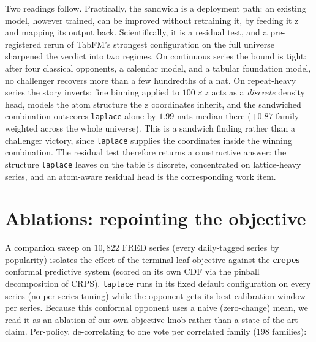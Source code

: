 \documentclass[article]{jss}
\providecommand{\proglang}[1]{\textsf{#1}}
\providecommand{\pkg}[1]{\textbf{#1}}
\providecommand{\code}[1]{\texttt{#1}}
\begin{document}
Two readings follow. Practically, the sandwich is a deployment path: an
existing model, however trained, can be improved without retraining it,
by feeding it z and mapping its output back. Scientifically, it is a
residual test, and a pre-registered rerun of TabFM's strongest
configuration on the full universe sharpened the verdict into two
regimes. On continuous series the bound is tight: after four classical
opponents, a calendar model, and a tabular foundation model, no
challenger recovers more than a few hundredths of a nat. On
repeat-heavy series the story inverts: fine binning applied to $100
\times z$ acts as a \emph{discrete} density head, models the atom
structure the z coordinates inherit, and the sandwiched combination
outscores \code{laplace} alone by $1.99$ nats median there ($+0.87$
family-weighted across the whole universe). This is a sandwich finding
rather than a challenger victory, since \code{laplace} supplies the
coordinates inside the winning combination. The residual test therefore returns a constructive answer: the
structure \code{laplace} leaves on the table is discrete, concentrated
on lattice-heavy series, and an atom-aware residual head is the
corresponding work item.

\section{Ablations: repointing the objective} \label{sec:ablations}

A companion sweep on $10{,}822$ \proglang{FRED} series (every daily-tagged series
by popularity) isolates the effect of the terminal-leaf objective against the
\pkg{crepes} conformal predictive system (scored on its own CDF via the pinball
decomposition of CRPS). \code{laplace} runs in its fixed default configuration on
every series (no per-series tuning) while the opponent gets its best
calibration window per series. Because this conformal opponent uses a naive
(zero-change) mean, we read it as an ablation of our own objective knob rather
than a state-of-the-art claim. Per-policy, de-correlating to one vote per
correlated family (198 families):
\end{document}
